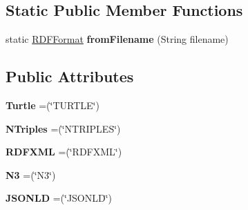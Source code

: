 \subsection*{Static Public Member Functions}
\begin{DoxyCompactItemize}
\item 
static \hyperlink{enumeu_1_1h2020_1_1symbiote_1_1ontology_1_1model_1_1RDFFormat}{R\+D\+F\+Format} {\bfseries from\+Filename} (String filename)\hypertarget{enumeu_1_1h2020_1_1symbiote_1_1ontology_1_1model_1_1RDFFormat_a865345942ea348992c8fc1129a654772}{}\label{enumeu_1_1h2020_1_1symbiote_1_1ontology_1_1model_1_1RDFFormat_a865345942ea348992c8fc1129a654772}

\end{DoxyCompactItemize}
\subsection*{Public Attributes}
\begin{DoxyCompactItemize}
\item 
{\bfseries Turtle} =(\char`\"{}T\+U\+R\+T\+LE\char`\"{})\hypertarget{enumeu_1_1h2020_1_1symbiote_1_1ontology_1_1model_1_1RDFFormat_ab2fc0194cb2fae24cb4ef442b57e1ad0}{}\label{enumeu_1_1h2020_1_1symbiote_1_1ontology_1_1model_1_1RDFFormat_ab2fc0194cb2fae24cb4ef442b57e1ad0}

\item 
{\bfseries N\+Triples} =(\char`\"{}N\+T\+R\+I\+P\+L\+ES\char`\"{})\hypertarget{enumeu_1_1h2020_1_1symbiote_1_1ontology_1_1model_1_1RDFFormat_a90e0cd43f13667dd67b641d102e01010}{}\label{enumeu_1_1h2020_1_1symbiote_1_1ontology_1_1model_1_1RDFFormat_a90e0cd43f13667dd67b641d102e01010}

\item 
{\bfseries R\+D\+F\+X\+ML} =(\char`\"{}R\+D\+F\+X\+ML\char`\"{})\hypertarget{enumeu_1_1h2020_1_1symbiote_1_1ontology_1_1model_1_1RDFFormat_ab69c58ec5cd51cc35eee3612f3a8a7f0}{}\label{enumeu_1_1h2020_1_1symbiote_1_1ontology_1_1model_1_1RDFFormat_ab69c58ec5cd51cc35eee3612f3a8a7f0}

\item 
{\bfseries N3} =(\char`\"{}N3\char`\"{})\hypertarget{enumeu_1_1h2020_1_1symbiote_1_1ontology_1_1model_1_1RDFFormat_afa7e4a7139033f31bbea9130c569fff8}{}\label{enumeu_1_1h2020_1_1symbiote_1_1ontology_1_1model_1_1RDFFormat_afa7e4a7139033f31bbea9130c569fff8}

\item 
{\bfseries J\+S\+O\+N\+LD} =(\char`\"{}J\+S\+O\+N\+LD\char`\"{})\hypertarget{enumeu_1_1h2020_1_1symbiote_1_1ontology_1_1model_1_1RDFFormat_af64123c7a90b909a256ed0dcd63b2998}{}\label{enumeu_1_1h2020_1_1symbiote_1_1ontology_1_1model_1_1RDFFormat_af64123c7a90b909a256ed0dcd63b2998}

\end{DoxyCompactItemize}


